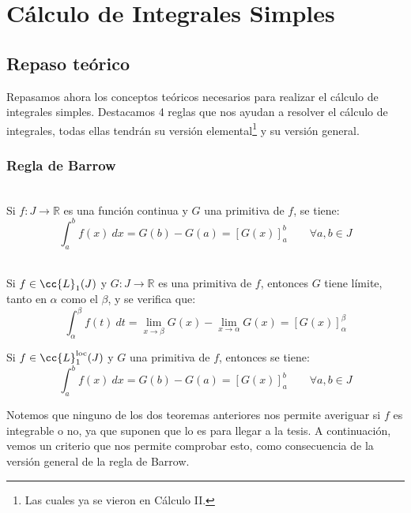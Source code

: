 \section{Cálculo de Integrales Simples}

\subsection{Repaso teórico}
Repasamos ahora los conceptos teóricos necesarios para realizar el cálculo de integrales simples. Destacamos 4 reglas que nos ayudan a resolver el cálculo de integrales, todas ellas tendrán su versión elemental\footnote{Las cuales ya se vieron en Cálculo II.} y su versión general.

\subsubsection{Regla de Barrow}
\begin{teo}\ \\
    Si $f:J\rightarrow\mathbb{R}$ es una función continua y $G$ una primitiva de $f$, se tiene:
    \begin{equation*}
        \int_{a}^{b} f(x)~dx  = G(b) - G(a) = {[G(x)]}_a^b\qquad \forall a,b\in J
    \end{equation*}
\end{teo}

\begin{teo}\ \\
    Si $f\in \cc{L}_1(J)$ y $G:J\rightarrow\mathbb{R}$ es una primitiva de $f$, entonces $G$ tiene límite, tanto en $\alpha$ como el $\beta$, y se verifica que:
    \begin{equation*}
        \displaystyle\int_{\alpha}^{\beta} f(t)~dt = \lim_{x\to\beta} G(x) -\lim_{x\to\alpha} G(x) = {[G(x)]}_\alpha^\beta
    \end{equation*}
\end{teo}
\begin{coro}
    Si $f\in \cc{L}_1^{\text{loc}}(J)$ y $G$ una primitiva de $f$, entonces se tiene:
    \begin{equation*}
        \int_{a}^{b} f(x)~dx  = G(b) - G(a) = {[G(x)]}_a^b\qquad \forall a,b\in J
    \end{equation*}
\end{coro}
Notemos que ninguno de los dos teoremas anteriores nos permite averiguar si $f$ es integrable o no, ya que suponen que lo es para llegar a la tesis. A continuación, vemos un criterio que nos permite comprobar esto, como consecuencia de la versión general de la regla de Barrow.


